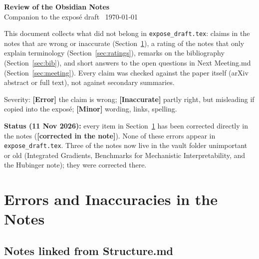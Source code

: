\documentclass[11pt,a4paper]{article}
\newcommand{\note}[1]{\textsf{#1}}                 %
\newcommand{\sev}[1]{\textbf{[#1]}}                 %
\newcommand{\fixed}{\textbf{\textcolor{green!50!black}{[corrected in the note]}}} %
\begin{document}
\begin{center}
  {\Large\bfseries Review of the Obsidian Notes}\\[0.6ex]
  Companion to the exposé draft \textbullet\ \today
\end{center}

This document collects what did not belong in \texttt{expose\_draft.tex}: claims in
the notes that are wrong or inaccurate (Section~\ref{sec:errors}), a rating
of the notes that only explain terminology (Section~\ref{sec:ratings}),
remarks on the bibliography (Section~\ref{sec:bib}), and short answers to the
open questions in \note{Next Meeting.md} (Section~\ref{sec:meeting}).
Every claim was checked against the paper itself (arXiv abstract or full
text), not against secondary summaries.

Severity: \sev{Error} the claim is wrong; \sev{Inaccurate} partly right, but
misleading if copied into the exposé; \sev{Minor} wording, links, spelling.

\textbf{Status (11 Nov 2026):} every item in Section~\ref{sec:errors} has
been corrected directly in the notes (\fixed). None of these errors appear
in \texttt{expose\_draft.tex}. Three of the notes now live in the vault folder
\note{unimportant or old} (Integrated Gradients, Benchmarks for Mechanistic
Interpretability, and the Hubinger note); they were corrected there.

\section{Errors and Inaccuracies in the Notes}\label{sec:errors}

\subsection{Notes linked from Structure.md}
\end{document}
